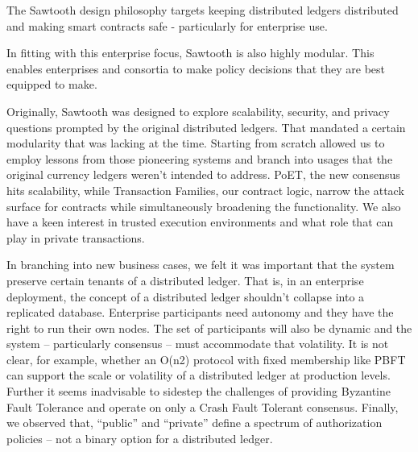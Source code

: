 The Sawtooth design philosophy targets keeping distributed ledgers distributed and making smart contracts safe - particularly for enterprise use.

In fitting with this enterprise focus, Sawtooth is also highly modular. This enables enterprises and consortia to make policy decisions that they are best equipped to make.

Originally, Sawtooth was designed to explore scalability, security, and privacy questions prompted by the original distributed ledgers. That mandated a certain modularity that was lacking at the time. Starting from scratch allowed us to employ lessons from those pioneering systems and branch into usages that the original currency ledgers weren’t intended to address. PoET, the new consensus hits scalability, while Transaction Families, our contract logic, narrow the attack surface for contracts while simultaneously broadening the functionality. We also have a keen interest in trusted execution environments and what role that can play in private transactions.

In branching into new business cases, we felt it was important that the system preserve certain tenants of a distributed ledger. That is, in an enterprise deployment, the concept of a distributed ledger shouldn’t collapse into a replicated database. Enterprise participants need autonomy and they have the right to run their own nodes. The set of participants will also be dynamic and the system – particularly consensus – must accommodate that volatility. It is not clear, for example, whether an O(n2) protocol with fixed membership like PBFT can support the scale or volatility of a distributed ledger at production levels. Further it seems inadvisable to sidestep the challenges of providing Byzantine Fault Tolerance and operate on only a Crash Fault Tolerant consensus. Finally, we observed that, “public” and “private” define a spectrum of authorization policies – not a binary option for a distributed ledger.
